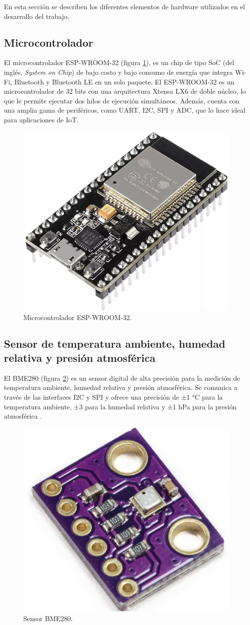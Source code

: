 En esta sección se describen los diferentes elementos de hardware utilizados en
el desarrollo del trabajo. 

\subsection{Microcontrolador}\label{sec:microcontrolador}

El microcontrolador ESP-WROOM-32 (figura \ref{fig:ESP32}), es un chip de tipo
SoC (del inglés, \textit{System on Chip}) de bajo costo y bajo consumo de
energía que integra Wi-Fi, Bluetooth y Bluetooth LE en un solo paquete. El
ESP-WROOM-32 \cite{EspressifESP32WROOM} es un microcontrolador de 32 bits con
una arquitectura Xtensa LX6 de doble núcleo, lo que le permite ejecutar dos
hilos de ejecución simultáneos. Además, cuenta con una amplia gama de
periféricos, como UART, I2C, SPI y ADC, que lo hace ideal para aplicaciones de
IoT.

\begin{figure}[H]
	\centering
	\includegraphics[height=.15\textwidth]{./Images/3.png}
	\caption{Microcontrolador ESP-WROOM-32\protect\footnotemark.}
	\label{fig:ESP32}
\end{figure}


\subsection{Sensor de temperatura ambiente, humedad relativa y presión atmosférica}

El BME280 (figura \ref{fig:BME280}) es un sensor digital de alta precisión para
la medición de temperatura ambiente, humedad relativa y presión atmosférica. Se
comunica a través de las interfaces I2C y SPI y ofrece una precisión de ±1 °C
para la temperatura ambiente, ±3 \code{\%} para la humedad relativa y ±1 hPa
para la presión atmosférica \cite{BoschBME280}.

\begin{figure}[H]
	\centering
	\includegraphics[height=.15\textwidth]{./Images/4.png}
	\caption{Sensor BME280\protect\footnotemark.}
	\label{fig:BME280}
\end{figure}

